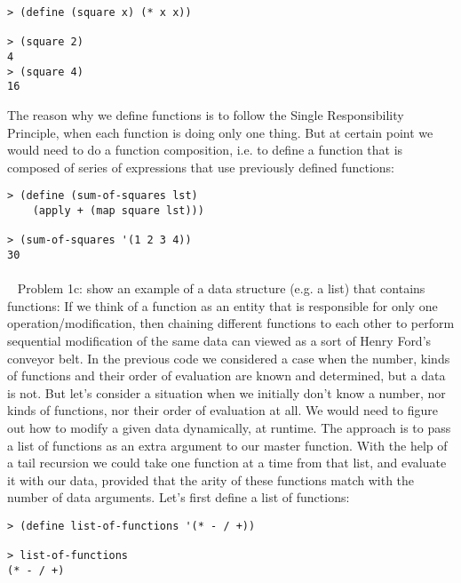 \documentclass{article}
\begin{document}
\begin{verbatim} 
> (define (square x) (* x x))

> (square 2)
4
> (square 4)
16
\end{verbatim}

The reason why we define functions is to follow the Single Responsibility Principle, when each function is doing only one thing. But at certain point we would need to do a function composition, i.e. to define a function that is composed of series of expressions that use previously defined functions:

\begin{verbatim} 
> (define (sum-of-squares lst)
    (apply + (map square lst)))
    
> (sum-of-squares '(1 2 3 4))
30
\end{verbatim}
\paragraph{}\
\rmfamily
Problem 1c: show an example of a data structure (e.g. a list) that contains functions:
\newline
\newline
If we think of a function as an entity that is responsible for only one operation/modification, then chaining different functions to each other to perform sequential modification of the same data can viewed as a sort of Henry Ford's conveyor belt. In the previous code we considered a case when the number, kinds of functions and their order of evaluation are known and determined, but a data is not. But let's consider a situation when we initially don't know a number, nor kinds of functions, nor their order of evaluation at all. We would need to figure out how to modify a given data dynamically, at runtime. The approach is to pass a list of functions as an extra argument to our master function. With the help of a tail recursion we could take one function at a time from that list, and evaluate it with our data, provided that the arity of these functions match with the number of data arguments. Let's first define a list of functions:

\begin{verbatim} 
> (define list-of-functions '(* - / +))

> list-of-functions
(* - / +)
\end{verbatim}
\end{document}
